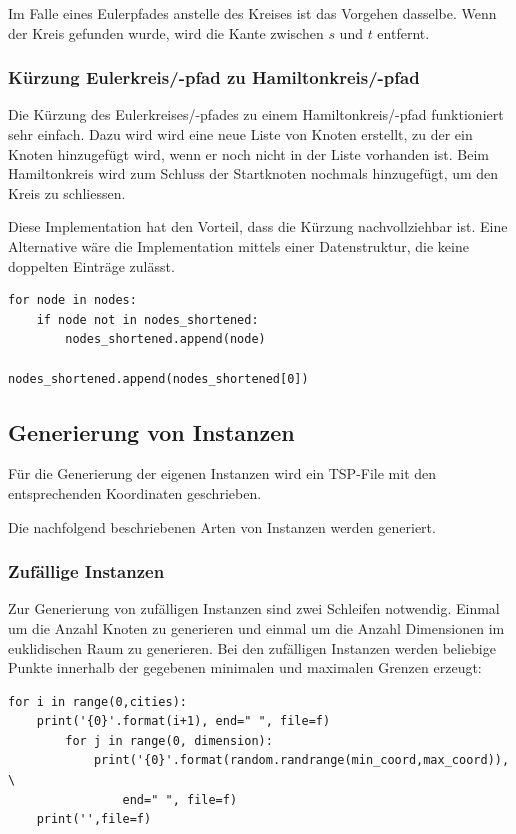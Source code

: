 \documentclass[11pt,a4paper]{article}
\begin{document}
\begin{flushleft}
   Im Falle eines Eulerpfades anstelle des Kreises ist das Vorgehen dasselbe. Wenn der Kreis gefunden wurde, wird die Kante zwischen $s$ und $t$ entfernt.
\end{flushleft}

\subsubsection{Kürzung Eulerkreis/-pfad zu Hamiltonkreis/-pfad}
Die Kürzung des Eulerkreises/-pfades zu einem Hamiltonkreis/-pfad funktioniert sehr einfach. Dazu wird wird eine neue Liste von Knoten erstellt, zu der ein Knoten hinzugefügt wird, wenn er noch nicht in der Liste vorhanden ist. Beim Hamiltonkreis wird zum Schluss der Startknoten nochmals hinzugefügt, um den Kreis zu schliessen. 

Diese Implementation hat den Vorteil, dass die Kürzung nachvollziehbar ist. Eine Alternative wäre die Implementation mittels einer Datenstruktur, die keine doppelten Einträge zulässt.

\begin{verbatim}
for node in nodes:
    if node not in nodes_shortened:
        nodes_shortened.append(node)

nodes_shortened.append(nodes_shortened[0])
\end{verbatim}

\subsection{Generierung von Instanzen}
Für die Generierung der eigenen Instanzen wird ein TSP-File mit den entsprechenden Koordinaten geschrieben.

Die nachfolgend beschriebenen Arten von Instanzen werden generiert.

\subsubsection{Zufällige Instanzen}
Zur Generierung von zufälligen Instanzen sind zwei Schleifen notwendig. Einmal um die Anzahl Knoten zu generieren und einmal um die Anzahl Dimensionen im euklidischen Raum zu generieren. Bei den zufälligen Instanzen werden beliebige Punkte innerhalb der gegebenen minimalen und maximalen Grenzen erzeugt:

\begin{verbatim}
for i in range(0,cities):
    print('{0}'.format(i+1), end=" ", file=f)
        for j in range(0, dimension):
            print('{0}'.format(random.randrange(min_coord,max_coord)), \
                end=" ", file=f)
    print('',file=f)
\end{verbatim}
\end{document}
